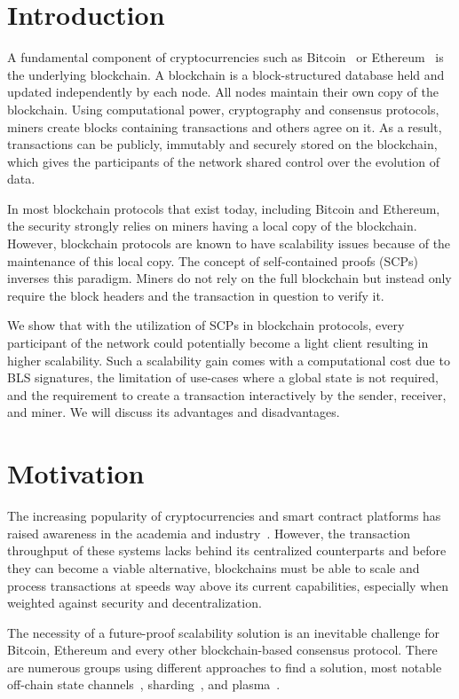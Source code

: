 \documentclass[conference]{IEEEtran}
\begin{document}
\section{Introduction}
A fundamental component of cryptocurrencies such as Bitcoin~\cite{Nakamoto08} or Ethereum~\cite{Wood14} is the underlying blockchain. A blockchain is a block-structured database held and updated independently by each node. All nodes maintain their own copy of the blockchain. Using computational power, cryptography and consensus protocols, miners create blocks containing transactions and others agree on it. As a result, transactions can be publicly, immutably and securely stored on the blockchain, which gives the participants of the network shared control over the evolution of data.

In most blockchain protocols that exist today, including Bitcoin and Ethereum, the security strongly relies on miners having a local copy of the blockchain. However, blockchain protocols are known to have scalability issues because of the maintenance of this local copy. The concept of self-contained proofs (SCPs) inverses this paradigm. Miners do not rely on the full blockchain but instead only require the block headers and the transaction in question to verify it. 

We show that with the utilization of SCPs in blockchain protocols, every participant of the network could potentially become a light client resulting in higher scalability. Such a scalability gain comes with a computational cost due to BLS signatures, the limitation of use-cases where a global state is not required, and the requirement to create a transaction interactively by the sender, receiver, and miner. We will discuss its advantages and disadvantages.

\section{Motivation}
The increasing popularity of cryptocurrencies and smart contract platforms has raised awareness in the academia and industry~\cite{BitcoinNG16, Zilliqa18, OmniLedger18}. However, the transaction throughput of these systems lacks behind its centralized counterparts and before they can become a viable alternative, blockchains must be able to scale and process transactions at speeds way above its current capabilities, especially when weighted against security and decentralization.

The necessity of a future-proof scalability solution is an inevitable challenge for Bitcoin, Ethereum and every other blockchain-based consensus protocol. There are numerous groups using different approaches to find a solution, most notable off-chain state channels~\cite{Poon18Lightning, RaidenNetwork}, sharding~\cite{Zilliqa18, Luu16}, and plasma~\cite{Poon18Plasma}.
\end{document}
